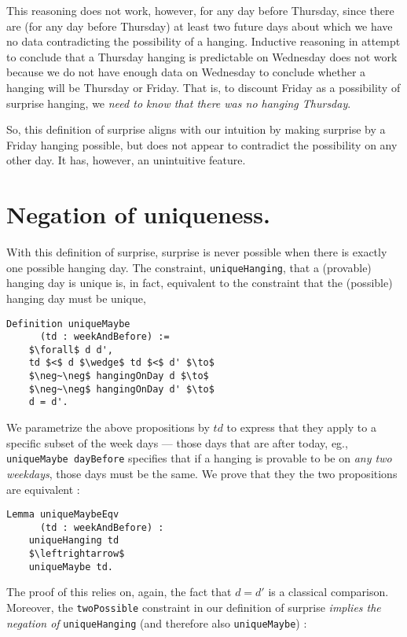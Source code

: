 \documentclass[journal]{journal}
\begin{document}
This reasoning does not work, however, for any
day before Thursday, since there are (for any day before Thursday) at least two future
days about which we have no
data contradicting the possibility of a hanging.
Inductive reasoning in attempt to conclude that a Thursday hanging is
predictable on Wednesday does not work because we do not have enough data on Wednesday
to conclude whether a hanging will be Thursday or Friday. That is, to discount Friday
as a possibility of surprise hanging, we \emph{need to know that there was no
hanging Thursday}.

So, this definition of surprise aligns with our intuition by making surprise
by a Friday hanging possible, but does not appear to contradict the possibility
on any other day. It has, however, an unintuitive feature.

\section{Negation of uniqueness. }
\label{sec:unique}

With this definition of surprise, surprise is never possible when there is
exactly one possible hanging day. The constraint, {\tt uniqueHanging}, that
a (provable) hanging day is unique is, in fact, equivalent to the constraint
that the (possible) hanging day must be unique,

\begin{lstlisting}[mathescape=true]
  Definition uniqueMaybe
      (td : weekAndBefore) :=
    $\forall$ d d',
    td $<$ d $\wedge$ td $<$ d' $\to$
    $\neg~\neg$ hangingOnDay d $\to$
    $\neg~\neg$ hangingOnDay d' $\to$
    d = d'.
\end{lstlisting}

We parametrize the above propositions by $td$ to express that they apply to
a specific subset of the week days --- those days that are after today,
eg., {\tt uniqueMaybe dayBefore} specifies that if a hanging is provable to be
on \emph{any two weekdays}, those days must be the same.
We prove that they the two propositions are equivalent :

\begin{lstlisting}[mathescape=true]
  Lemma uniqueMaybeEqv
      (td : weekAndBefore) :
    uniqueHanging td
    $\leftrightarrow$
    uniqueMaybe td.
\end{lstlisting}

The proof of this relies on, again, the fact that $d = d'$ is a classical
comparison. Moreover, the {\tt twoPossible} constraint
in our definition of surprise \emph{implies the negation of} {\tt uniqueHanging}
(and therefore also {\tt uniqueMaybe}) :
\end{document}
